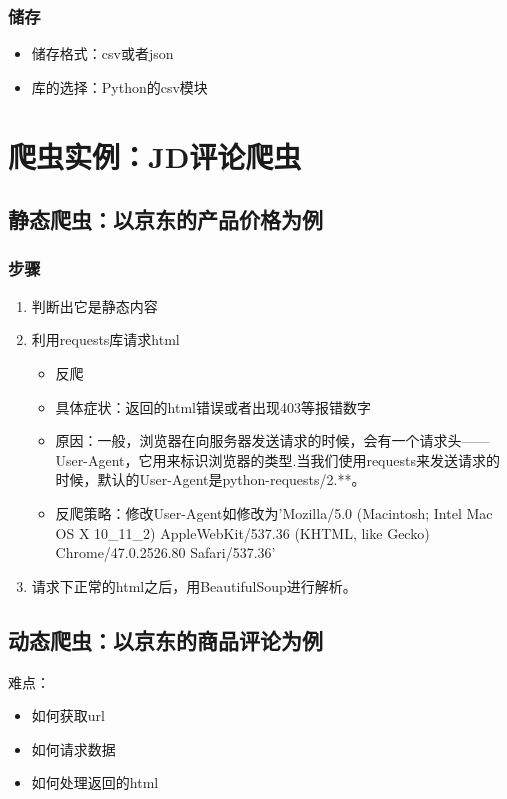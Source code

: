\documentclass{beamer}
\begin{document}
\begin{frame}
\frametitle{储存}
\begin{itemize}
   \item 储存格式：csv或者json 
   \item 库的选择：Python的csv模块
\end{itemize}
\end{frame}

\section{爬虫实例：JD评论爬虫}
\subsection{静态爬虫：以京东的产品价格为例}
\begin{frame}
\frametitle{步骤}
\begin{enumerate}
  \item 判断出它是静态内容
  \item 利用requests库请求html
  \begin{itemize}
  	\item 反爬
  	\item 具体症状：返回的html错误或者出现403等报错数字
  	\item
  	原因：一般，浏览器在向服务器发送请求的时候，会有一个请求头——User-Agent，它用来标识浏览器的类型.当我们使用requests来发送请求的时候，默认的User-Agent是python-requests/2.**。
    \item 反爬策略：修改User-Agent如修改为'Mozilla/5.0 (Macintosh; Intel Mac OS X
    10\_11\_2) AppleWebKit/537.36 (KHTML, like Gecko) Chrome/47.0.2526.80 Safari/537.36'
  \end{itemize}
  \item 请求下正常的html之后，用BeautifulSoup进行解析。
\end{enumerate}
\end{frame}

\subsection{动态爬虫：以京东的商品评论为例}
\begin{frame}
难点：
\begin{itemize}
  \item 如何获取url
  \item 如何请求数据
  \item 如何处理返回的html
\end{itemize}
\end{frame}
\end{document}
